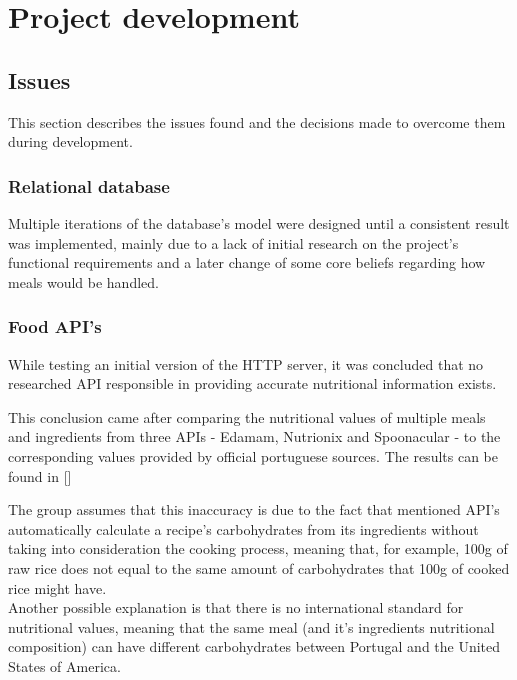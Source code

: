 %
%
\chapter{Project development}

    \section{Issues}

    This section describes the issues found and the decisions made
    to overcome them during development.
    
    \subsection{Relational database}

    Multiple iterations of the database's model were designed until a consistent result was implemented,
    mainly due to a lack of initial research on the project's functional requirements and a later change
    of some core beliefs regarding how meals would be handled.\\

    \subsection{Food API's}

    While testing an initial version of the HTTP server,
    it was concluded that no researched API responsible in
    providing accurate nutritional information exists.

    This conclusion came after comparing the nutritional values of multiple
    meals and ingredients from three APIs - Edamam, Nutrionix and Spoonacular -
    to the corresponding values provided by official portuguese sources. 
    The results can be found in []

    The group assumes that this inaccuracy is due to the fact that
    mentioned API's automatically calculate a recipe's carbohydrates
    from its ingredients without taking into consideration the cooking process, meaning that, for example,  
    100g of raw rice does not equal to the same amount of carbohydrates that 100g of 
    cooked rice might have.\\

    Another possible explanation is that there is no international standard for nutritional values,
    meaning that the same meal (and it's ingredients nutritional composition) 
    can have different carbohydrates between Portugal and the United States of America.\\
    
